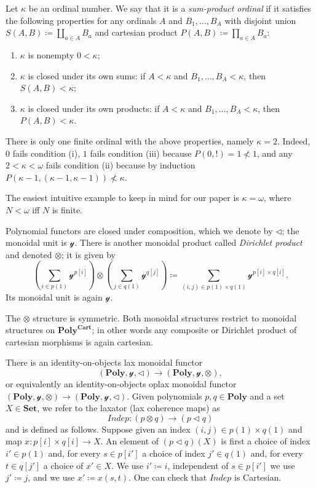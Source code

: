 \documentclass[11pt, one side, article]{memoir}
\theoremstyle{definition}
\theoremstyle{plain}
\newenvironment{example}
  {\pushQED{\qed}\renewcommand{\qedsymbol}{$\lozenge$}\examplex}
  {\popQED\endexamplex}
\newenvironment{definition}
  {\pushQED{\qed}\renewcommand{\qedsymbol}{$\lozenge$}\definitionx}
  {\popQED\enddefinitionx}
\newcommand{\Cat}[1]{\mathbf{#1}}%
\newcommand{\Fun}[1]{\mathit{#1}}%
\newcommand{\smset}{\Cat{Set}}
\newcommand{\yon}{\mathcal{y}}
\newcommand{\poly}{\Cat{Poly}}
\newcommand{\polycart}{\poly^{\Cat{Cart}}}
\newcommand{\0}{\textsf{0}}
\newcommand{\1}{\tn{\textsf{1}}}
\newcommand{\tri}{\mathbin{\triangleleft}}
\newcommand{\indep}{\Fun{Indep}}
\begin{document}
\begin{definition}[Sum-product ordinal]\label{def.sum_prod_ord}
Let $\kappa$ be an ordinal number. We say that it is a \emph{sum-product ordinal} if it satisfies the following properties for any ordinals $A$ and $B_1,\ldots,B_A$ with disjoint union $S(A,B)\coloneqq\coprod_{a\in A}B_a$ and cartesian product $P(A,B)\coloneqq\prod_{a\in A}B_a$:
\begin{enumerate}[label=(\roman*)]
	\item $\kappa$ is nonempty $0<\kappa$;
	\item $\kappa$ is closed under its own sums: if $A<\kappa$ and $B_1,\ldots,B_A<\kappa$, then $S(A,B)<\kappa$;
	\item $\kappa$ is closed under its own products: if $A<\kappa$ and $B_1,\ldots,B_A<\kappa$, then $P(A,B)<\kappa$.
\end{enumerate}
\end{definition}

\begin{example}\label{ex.sum_prod_ordinal}
There is only one finite ordinal with the above properties, namely $\kappa=2$. Indeed, $0$ fails condition (i), $1$ fails condition (iii) because $P(0,!)=1\not<1$, and any $2<\kappa<\omega$ fails condition (ii) because by induction $P(\kappa-1,(\kappa-1,\kappa-1))\not<\kappa$.

The easiest intuitive example to keep in mind for our paper is $\kappa=\omega$, where $N<\omega$ iff $N$ is finite.
\end{example}


Polynomial functors are closed under composition, which we denote by $\tri$; the monoidal unit is $\yon$. There is another monoidal product called \emph{Dirichlet product} and denoted $\otimes$; it is given by
\[
\left(\sum_{i\in p(1)}\yon^{p[i]}\right)\otimes
\left(\sum_{j\in q(1)}\yon^{q[j]}\right)\coloneqq
\sum_{(i,j)\in p(1)\times q(1)}\yon^{p[i]\times q[i]}.
\]
Its monoidal unit is again $\yon$. 

The $\otimes$ structure is symmetric. Both monoidal structures restrict to monoidal structures on $\polycart$; in other words any composite or Dirichlet product of cartesian morphisms is again cartesian.

There is an identity-on-objects lax monoidal functor
\begin{equation}\label{eqn.indep}
(\poly,\yon,\tri)\to(\poly,\yon,\otimes),
\end{equation}
or equivalently an identity-on-objects oplax monoidal functor $(\poly,\yon,\otimes)\to(\poly,\yon,\tri)$. Given polynomials $p,q\in\poly$ and a set $X\in\smset$, we refer to the laxator (lax coherence maps) as
\[\indep\colon (p\otimes q)\to (p\tri q)\]
and is defined as follows. Suppose given an index $(i,j)\in p(1)\times q(1)$ and map $x\colon p[i]\times q[i]\to X$. An element of $(p\tri q)(X)$ is first a choice of index $i'\in p(1)$ and, for every $s\in p[i']$ a choice of index $j'\in q(1)$ and, for every $t\in q[j']$ a choice of $x'\in X$. We use $i'\coloneqq i$, independent of $s\in p[i']$ we use $j'\coloneqq j$, and we use $x'\coloneqq x(s,t)$. One can check that $\indep$ is Cartesian.
\end{document}
